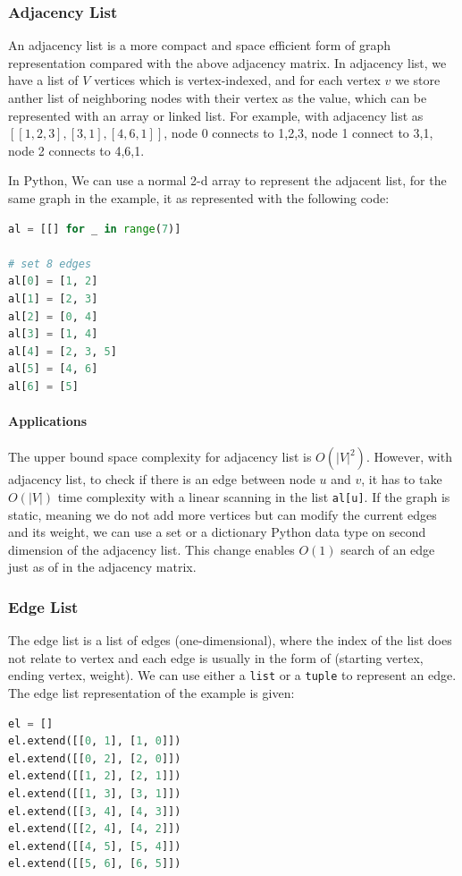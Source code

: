\documentclass[../main.tex]{subfiles}
\begin{document}
\subsubsection{Adjacency List}
An adjacency list is a more compact and space efficient form of graph representation compared with the above adjacency matrix. In adjacency list, we have a list of $V$ vertices which is vertex-indexed, and for each vertex $v$ we store anther list of neighboring nodes with their vertex  as the value, which can be represented with an array or linked list.  For example,  with adjacency list as $[[1,2,3],[3,1],[4,6,1]]$, node 0 connects to 1,2,3, node 1 connect to 3,1, node 2 connects to 4,6,1. 

In Python, We can use a normal 2-d array to represent the adjacent list, for the same graph in the example, it as represented with the following code:
\begin{lstlisting}[language=Python, numbers=none]
al = [[] for _ in range(7)]

# set 8 edges
al[0] = [1, 2]
al[1] = [2, 3]
al[2] = [0, 4]
al[3] = [1, 4]
al[4] = [2, 3, 5]
al[5] = [4, 6]
al[6] = [5]
\end{lstlisting}

\paragraph{Applications}
The upper bound space complexity for adjacency list is $O(|V|^2)$. However, with adjacency list, to check if there is an edge between node $u$ and $v$, it has to take $O(|V|)$ time complexity  with a linear scanning in the list \texttt{al[u]}. If the graph is static, meaning we do not add more vertices but can modify the current edges and its weight, we can use a set or a dictionary Python data type on second dimension of the adjacency list. This change  enables $O(1)$ search of an edge just as of in the adjacency matrix. 

\subsubsection{Edge List}
The edge list is a list of edges (one-dimensional), where the index of the list does not relate to vertex and each edge is usually in the form of (starting vertex, ending vertex, weight). We can use either a \texttt{list} or a \texttt{tuple} to represent an edge. The edge list representation of the example is given:
\begin{lstlisting}[language=Python, numbers=none]
el = []
el.extend([[0, 1], [1, 0]])
el.extend([[0, 2], [2, 0]])
el.extend([[1, 2], [2, 1]])
el.extend([[1, 3], [3, 1]])
el.extend([[3, 4], [4, 3]])
el.extend([[2, 4], [4, 2]])
el.extend([[4, 5], [5, 4]])
el.extend([[5, 6], [6, 5]])
\end{lstlisting}
\end{document}
